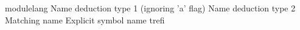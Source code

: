 \begin{mhmodnl}[creators=marian]{module}{lang}
    Name deduction type 1 (ignoring 'a' flag) 
    Name deduction type 2 
    Matching name 
    Explicit symbol name trefi 
\end{mhmodnl}